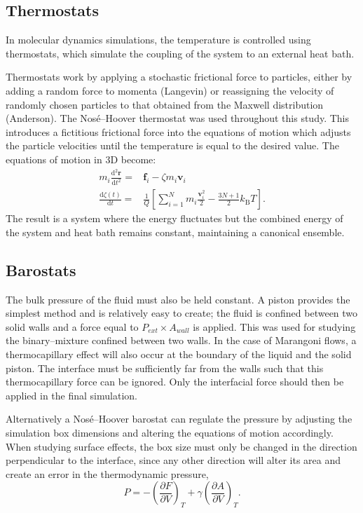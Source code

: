 \subsection{Thermostats}\label{Thermostats}
In molecular dynamics simulations, the temperature is controlled using thermostats, which simulate the coupling of the system to an external heat bath.

Thermostats work by applying a stochastic frictional force to particles, either by adding a random force to momenta (Langevin)\cite{Langevin} or reassigning the velocity of randomly chosen particles to that obtained from the Maxwell distribution (Anderson)\cite{AndersonTherm}.
The Nos\'{e}--Hoover thermostat was used throughout this study.
This introduces a fictitious frictional force into the equations of motion which adjusts the particle velocities until the temperature is equal to the desired value.\cite{NoseHoover1, NoseHoover2, NoseHoover3}
The equations of motion in 3D become:
\begin{align}
m_{i}\frac{\mathrm{d}^{2}\mathbf{r}_{}}{\mathrm{d} t ^{2}} =& \mathbf{f}_{i} - \zeta m_{i} \mathbf{v}_{i}\\
\frac{\mathrm{d} \zeta (t)}{\mathrm{d} t} =& \frac{1}{Q}\left[ \sum_{i=1}^{N} m_{i} \frac{\mathbf{v}^{2}_{i}}{2} - \frac{3N+1}{2}k_{\mathrm{B}}T\right].
\end{align}
The result is a system where the energy fluctuates but the combined energy of the system and heat bath remains constant, maintaining a canonical ensemble.

\subsection{Barostats}\label{Barostats}
The bulk pressure of the fluid must also be held constant.
A piston provides the simplest method and is relatively easy to create; the fluid is confined between two solid walls and a force equal to $P_{ext} \times A_{wall}$ is applied.
This was used for studying the binary--mixture confined between two walls.
In the case of Marangoni flows, a thermocapillary effect will also occur at the boundary of the liquid and the solid piston.
The interface must be sufficiently far from the walls such that this thermocapillary force can be ignored.
Only the interfacial force should then be applied in the final simulation.

Alternatively a Nos\'{e}--Hoover barostat can regulate the pressure by adjusting the simulation box dimensions and altering the equations of motion accordingly. \cite{NoseHoover1, NoseHoover2, NoseHoover3}
When studying surface effects, the box size must only be changed in the direction perpendicular to the interface, since any other direction will alter its area and create an error in the thermodynamic pressure,
\begin{equation}
P = - \left( \frac{\partial F}{\partial V} \right)_{T} + \gamma \left( \frac{\partial A}{\partial V} \right)_{T}.
\end{equation}

